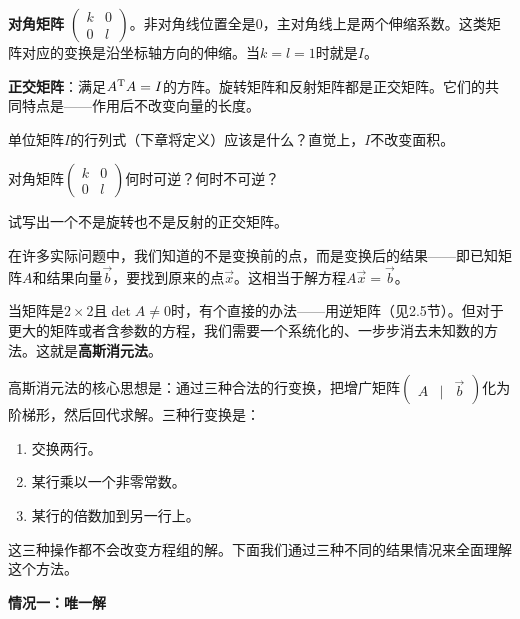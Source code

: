 \textbf{对角矩阵} $\begin{pmatrix}k&0\\0&l\end{pmatrix}$。非对角线位置全是$0$，主对角线上是两个伸缩系数。这类矩阵对应的变换是沿坐标轴方向的伸缩。当$k=l=1$时就是$I$。

\textbf{正交矩阵}：满足$A^\text T A=I$的方阵。旋转矩阵和反射矩阵都是正交矩阵。它们的共同特点是——作用后不改变向量的长度。

\begin{exercise}
\item 单位矩阵$I$的行列式（下章将定义）应该是什么？直觉上，$I$不改变面积。
\item 对角矩阵$\begin{pmatrix}k&0\\0&l\end{pmatrix}$何时可逆？何时不可逆？
\item 试写出一个不是旋转也不是反射的正交矩阵。
\end{exercise}


在许多实际问题中，我们知道的不是变换前的点，而是变换后的结果——即已知矩阵$A$和结果向量$\vec b$，要找到原来的点$\vec x$。这相当于解方程$A\vec x = \vec b$。

当矩阵是$2\times2$且$\det A\neq0$时，有个直接的办法——用逆矩阵（见2.5节）。但对于更大的矩阵或者含参数的方程，我们需要一个系统化的、一步步消去未知数的方法。这就是\textbf{高斯消元法}。

高斯消元法的核心思想是：通过三种合法的行变换，把增广矩阵$\begin{pmatrix}A & | & \vec b\end{pmatrix}$化为阶梯形，然后回代求解。三种行变换是：
\begin{enumerate}
\item 交换两行。
\item 某行乘以一个非零常数。
\item 某行的倍数加到另一行上。
\end{enumerate}

这三种操作都不会改变方程组的解。下面我们通过三种不同的结果情况来全面理解这个方法。

\vspace{0.2cm}
\noindent\textbf{情况一：唯一解}

